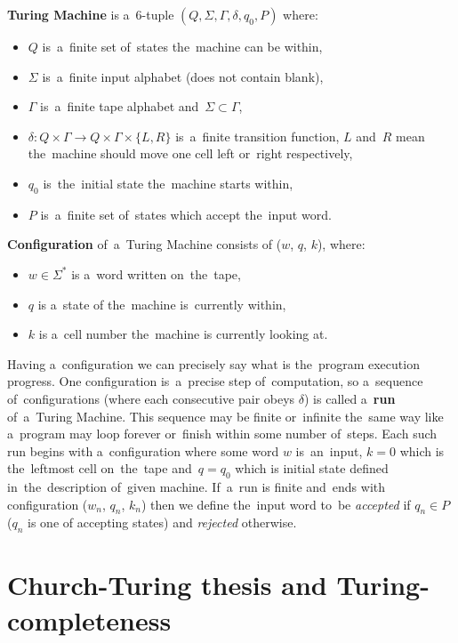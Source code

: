 \documentclass[english,shortabstract,mgr]{iithesis}
\begin{document}
\textbf{Turing Machine} is a~$6$-tuple $(Q,\Sigma,\Gamma,\delta,q_0,P)$ where:
\begin{itemize}
  \item $Q$ is~a~finite set of~states the~machine can be within,
  \item $\Sigma$ is~a~finite input alphabet (does not contain blank),
  \item $\Gamma$ is~a~finite tape alphabet and~$\Sigma \subset \Gamma$,
  \item $\delta: Q \times \Gamma \rightarrow Q \times \Gamma \times \{L,R\}$ is~a~finite
      transition function, $L$ and~$R$ mean the~machine should move one cell left or~right
      respectively,
  \item $q_0$ is~the~initial state the~machine starts within,
  \item $P$ is~a~finite set of~states which accept the~input word.
\end{itemize}

\textbf{Configuration} of~a~Turing Machine consists of ($w$, $q$, $k$), where:
\begin{itemize}
  \item $w \in \Sigma^*$ is a~word written on~the~tape,
  \item $q$ is a~state of the~machine is~currently within,
  \item $k$ is a~cell number the~machine is currently looking at.
\end{itemize}

Having a~configuration we can precisely say what is the~program execution progress.
One configuration is~a~precise step of~computation, so a~sequence of~configurations (where
each consecutive pair obeys $\delta$) is called
a~\textbf{run} of~a~Turing Machine. This sequence may be finite or~infinite the~same way like
a~program may loop forever or~finish within some number of~steps. Each such run begins with
a~configuration where some word $w$ is~an~input, $k = 0$ which is the~leftmost cell on~the~tape
and~$q = q_0$ which is initial state defined in~the~description of~given machine. If~a~run is
finite and~ends with configuration ($w_n$, $q_n$, $k_n$) then we define the~input word to~be
\textit{accepted} if $q_n \in P$ ($q_n$ is one of accepting states) and \textit{rejected} otherwise.

\section{Church-Turing thesis and Turing-completeness}
\end{document}
